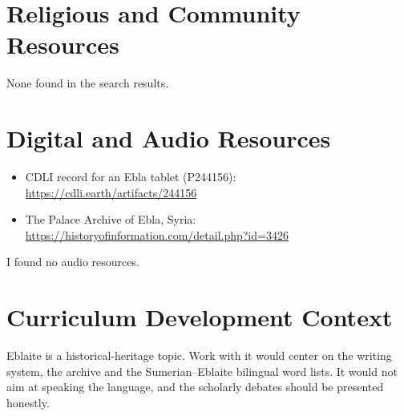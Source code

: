\documentclass[12pt]{article}
\begin{document}
\section{Religious and Community Resources}
None found in the search results.

\section{Digital and Audio Resources}
\begin{itemize}
\item CDLI record for an Ebla tablet (P244156): \url{https://cdli.earth/artifacts/244156}
\item The Palace Archive of Ebla, Syria: \url{https://historyofinformation.com/detail.php?id=3426}
\end{itemize}
I found no audio resources.

\section{Curriculum Development Context}
Eblaite is a historical-heritage topic. Work with it would center on the writing system, the archive and the Sumerian--Eblaite bilingual word lists. It would not aim at speaking the language, and the scholarly debates should be presented honestly.
\end{document}
